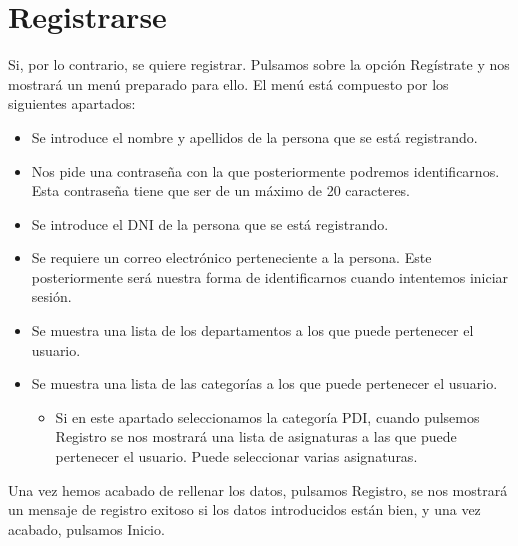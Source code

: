 \documentclass[letterpaper,10pt,spanish]{sphinxmanual}
\begin{document}
\section{Registrarse}
\label{\detokenize{documentos/ejecucion:registrarse}}
\sphinxAtStartPar
Si, por lo contrario, se quiere registrar. Pulsamos sobre la opción Regístrate y nos mostrará un menú preparado para ello.
El menú está compuesto por los siguientes apartados:
\begin{itemize}
\item {} 
\sphinxAtStartPar
{} Se introduce el nombre y apellidos de la persona que se está registrando.

\item {} 
\sphinxAtStartPar
{} Nos pide una contraseña con la que posteriormente podremos identificarnos. Esta contraseña tiene que ser de un máximo de 20 caracteres.

\item {} 
\sphinxAtStartPar
{} Se introduce el DNI de la persona que se está registrando.

\item {} 
\sphinxAtStartPar
{} Se requiere un correo electrónico perteneciente a la persona. Este posteriormente será nuestra forma de identificarnos cuando intentemos iniciar sesión.

\item {} 
\sphinxAtStartPar
{} Se muestra una lista de los departamentos a los que puede pertenecer el usuario.

\item {} 
\sphinxAtStartPar
{} Se muestra una lista de las categorías a los que puede pertenecer el usuario.
\begin{itemize}
\item {} 
\sphinxAtStartPar
Si en este apartado seleccionamos la categoría PDI, cuando pulsemos Registro se nos mostrará una lista de asignaturas a las que puede pertenecer el usuario. Puede seleccionar varias asignaturas.

\end{itemize}

\end{itemize}

\sphinxAtStartPar
Una vez hemos acabado de rellenar los datos, pulsamos Registro, se nos mostrará un mensaje de registro exitoso si los datos introducidos están bien,
y una vez acabado, pulsamos Inicio.
\end{document}
